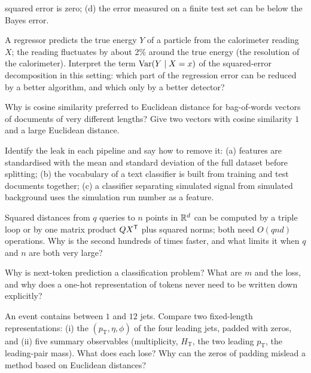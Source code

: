 \documentclass[11pt]{article}
\begin{document}
\begin{questions}
\begin{conceptual}
squared error is zero; (d) the error measured on a finite test set can be below the Bayes error.
\item A regressor predicts the true energy $Y$ of a particle from the calorimeter reading $X$; the reading fluctuates
by about 2\% around the true energy (the resolution of the calorimeter). Interpret the term $\operatorname{Var}(Y \mid X = x)$ of the squared-error decomposition in this setting: which
part of the regression error can be reduced by a better algorithm, and which only by a better detector?
\item Why is cosine similarity preferred to Euclidean distance for bag-of-words vectors of documents of very
different lengths? Give two vectors with cosine similarity $1$ and a large Euclidean distance.
\item Identify the leak in each pipeline and say how to remove it: (a) features are standardised with the mean and
standard deviation of the full dataset before splitting; (b) the vocabulary of a text classifier is built from
training and test documents together; (c) a classifier separating simulated signal from simulated background uses
the simulation run number as a feature.
\item Squared distances from $q$ queries to $n$ points in $\mathbb{R}^d$ can be computed by a triple loop or by one matrix
product $QX^{\mathsf{T}}$ plus squared norms; both need $O(qnd)$ operations. Why is the second hundreds of times faster, and
what limits it when $q$ and $n$ are both very large?
\item Why is next-token prediction a classification problem? What are $m$ and the loss, and why does a one-hot
representation of tokens never need to be written down explicitly?
\item An event contains between $1$ and $12$ jets. Compare two fixed-length representations: (i) the
$(p_{\mathrm T}, \eta, \phi)$ of the four leading jets, padded with zeros, and (ii) five summary observables
(multiplicity, $H_{\mathrm T}$, the two leading $p_{\mathrm T}$, the leading-pair mass). What does each lose? Why can
the zeros of padding mislead a method based on Euclidean distances?
\end{conceptual}


\end{questions}
\end{document}
